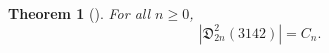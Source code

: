 \documentclass[
final
]{dmtcs-episciences}
\newtheorem{theorem}{Theorem}[section]%
\theoremstyle{definition}
\theoremstyle{remark}
\begin{document}
\begin{theorem}[\cite{Burstein_Restricted}]
\label{3142_thm}
For all $n\ge 0$,
\[
|\mathfrak{D}^2_{2n} (3142)| = C_{n}.
\]
\end{theorem}
%
%
%
%
\end{document}
